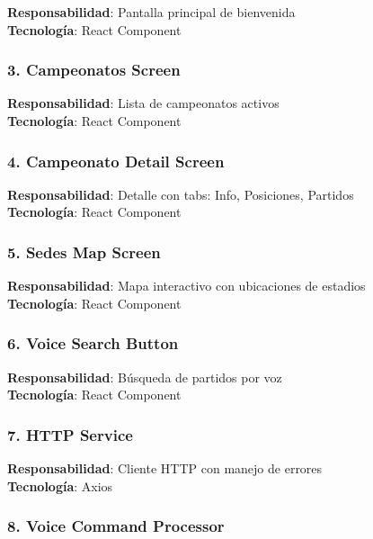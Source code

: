 \documentclass[
  spanish,
  11pt,
  letterpaper,
]{book}
\begin{document}
\textbf{Responsabilidad}: Pantalla principal de bienvenida\\
\textbf{Tecnología}: React Component

\subsubsection{3. Campeonatos Screen}\label{campeonatos-screen}

\textbf{Responsabilidad}: Lista de campeonatos activos\\
\textbf{Tecnología}: React Component

\subsubsection{4. Campeonato Detail
Screen}\label{campeonato-detail-screen}

\textbf{Responsabilidad}: Detalle con tabs: Info, Posiciones, Partidos\\
\textbf{Tecnología}: React Component

\subsubsection{5. Sedes Map Screen}\label{sedes-map-screen}

\textbf{Responsabilidad}: Mapa interactivo con ubicaciones de estadios\\
\textbf{Tecnología}: React Component

\subsubsection{6. Voice Search Button}\label{voice-search-button}

\textbf{Responsabilidad}: Búsqueda de partidos por voz\\
\textbf{Tecnología}: React Component

\subsubsection{7. HTTP Service}\label{http-service}

\textbf{Responsabilidad}: Cliente HTTP con manejo de errores\\
\textbf{Tecnología}: Axios

\subsubsection{8. Voice Command
Processor}\label{voice-command-processor}
\end{document}
